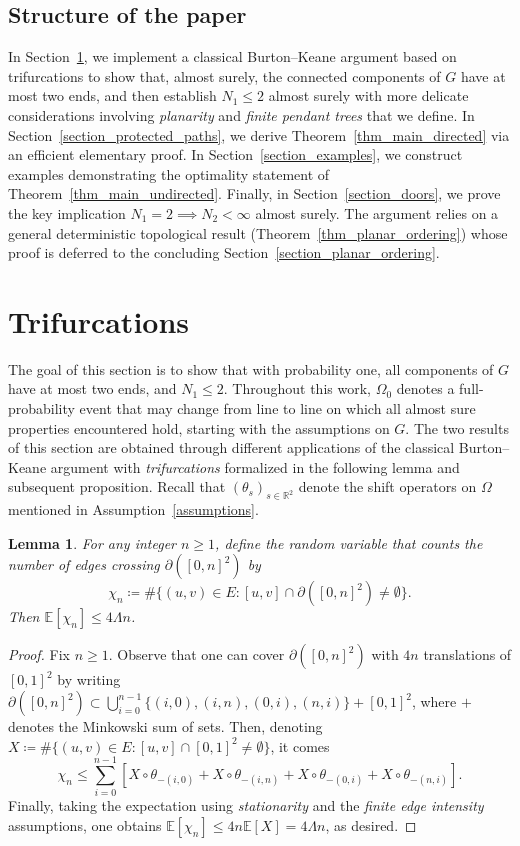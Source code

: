\documentclass[a4paper, 11pt]{article} %
\theoremstyle{plain}
\newtheorem{lemma}[theorem]{Lemma}
\newcommand{\E}{\mathbb{E}}
\newcommand{\R}{\mathbb{R}}
\newcommand{\1}{\mathds 1}
\numberwithin{equation}{section}
\begin{document}
\subsection*{Structure of the paper}


In Section~\ref{section_trifurcation}, we implement a classical Burton–Keane argument based on trifurcations to show that, almost surely, the connected components of $G$ have at most two ends, and then establish $N_1\leq 2$ almost surely with more delicate considerations involving \emph{planarity} and \emph{finite pendant trees} that we define. In Section~\ref{section_protected_paths}, we derive Theorem~\ref{thm_main_directed} via an efficient elementary proof. In Section~\ref{section_examples}, we construct examples demonstrating the optimality statement of Theorem~\ref{thm_main_undirected}. Finally, in Section~\ref{section_doors}, we prove the key implication $N_1=2\implies N_2<\infty$ almost surely. The argument relies on a general deterministic topological result (Theorem~\ref{thm_planar_ordering}) whose proof is deferred to the concluding Section~\ref{section_planar_ordering}.


\section{Trifurcations}

\label{section_trifurcation}


The goal of this section is to show that with probability one, all components of $G$ have at most two ends, and $N_1\leq 2$. Throughout this work, $\Omega_0$ denotes a full-probability event that may change from line to line on which all almost sure properties encountered hold, starting with the assumptions on $G$. The two results of this section are obtained through different applications of the classical Burton–Keane argument with \emph{trifurcations} formalized in the following lemma and subsequent proposition. Recall that $(\theta_s)_{s\in\R^2}$ denote the shift operators on $\Omega$ mentioned in Assumption~\ref{assumptions}.


\begin{lemma}
    \label{lemma_box_crossings}
    For any integer $n\geq1$, define the random variable that counts the number of edges crossing $\partial([0,n]^2)$ by
        \[\chi_n\coloneqq\#\{(u,v)\in E:[u,v]\cap\partial([0,n]^2)\neq\emptyset\}.\]
    Then $\E[\chi_n]\leq 4\Lambda n$.
\end{lemma}

\begin{proof}
    Fix $n\geq1$. Observe that one can cover $\partial([0,n]^2)$ with $4n$ translations of $[0,1]^2$ by writing $\partial([0,n]^2)\subset\bigcup_{i=0}^{n-1}\{(i, 0),(i, n), (0,i), (n, i)\}+[0,1]^2$, where $+$ denotes the Minkowski sum of sets. Then, denoting $X\coloneq\#\{(u,v)\in E:[u,v]\cap [0,1]^2\neq\emptyset\}$, it comes
        \[\chi_n\leq\sum_{i=0}^{n-1}[X\circ\theta_{-(i,0)}+X\circ\theta_{-(i,n)}+X\circ\theta_{-(0,i)}+X\circ\theta_{-(n,i)}].\]
    Finally, taking the expectation using \emph{stationarity} and the \emph{finite edge intensity} assumptions, one obtains $\E[\chi_n]\leq4n\E[X]=4\Lambda n$, as desired.
\end{proof}
\end{document}
